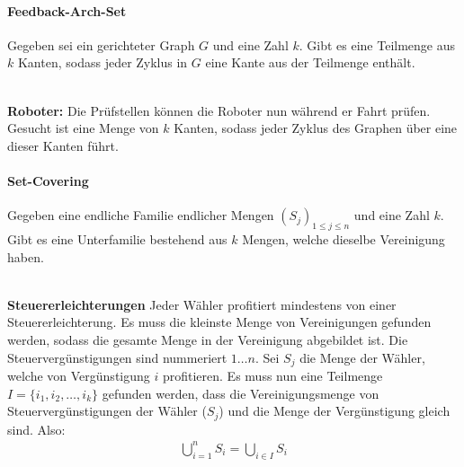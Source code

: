 \paragraph{Feedback-Arch-Set} Gegeben sei ein gerichteter Graph \(G\) und eine Zahl \(k\). Gibt es eine Teilmenge aus \(k\) Kanten, sodass jeder Zyklus in \(G\) eine Kante aus der Teilmenge enthält.\\
\\
\textbf{Roboter:} Die Prüfstellen können die Roboter nun während er Fahrt prüfen. Gesucht ist eine Menge von \(k\) Kanten, sodass jeder Zyklus des Graphen über eine dieser Kanten führt.
\paragraph{Set-Covering} Gegeben eine endliche Familie endlicher Mengen \( (S_j)_{1\leq j\leq n} \) und eine Zahl \(k\). Gibt es eine Unterfamilie bestehend aus \(k\) Mengen, welche dieselbe Vereinigung haben.\\
\\
\textbf{Steuererleichterungen} Jeder Wähler profitiert mindestens von einer Steuererleichterung. Es muss die kleinste Menge von Vereinigungen gefunden werden, sodass die gesamte Menge in der Vereinigung abgebildet ist. Die Steuervergünstigungen sind nummeriert \(1 \ldots n\). Sei \(S_j\) die Menge der Wähler, welche von Vergünstigung \(i\) profitieren. Es muss nun eine Teilmenge \(I= \{i_1, i_2, \ldots, i_k\} \) gefunden werden, dass die Vereinigungsmenge von Steuervergünstigungen der Wähler (\(S_j\)) und die Menge der Vergünstigung gleich sind. Also:
\begin{align*}
    \bigcup_{i=1}^n S_i = \bigcup_{i \in I} S_i
\end{align*}
